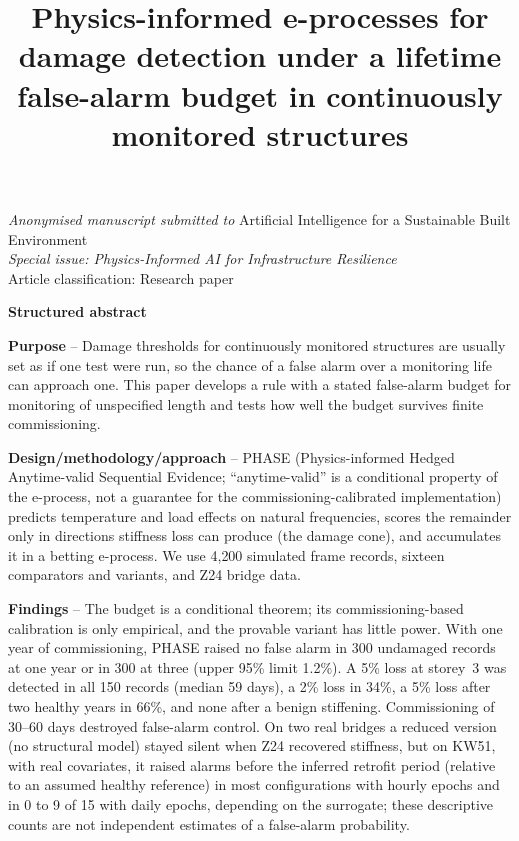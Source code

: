 \documentclass[12pt,a4paper]{article}
\title{\textbf{Physics-informed e-processes for damage detection under a lifetime false-alarm budget in continuously monitored structures}}
\date{}
\newcommand{\rev}[1]{#1}
\newcommand{\rev}[1]{{\color{revcol}#1}}
\begin{document}
\maketitle
\thispagestyle{empty}

\begin{center}
\textit{Anonymised manuscript submitted to} Artificial Intelligence for a Sustainable Built Environment\\
\textit{Special issue: Physics-Informed AI for Infrastructure Resilience}\\
Article classification: Research paper
\end{center}

\vspace{1em}

\begin{singlespace}
\noindent\textbf{Structured abstract}

\rev{\noindent\textbf{Purpose} -- Damage thresholds for continuously monitored structures are usually set as if one test were run, so the chance of a false alarm over a monitoring life can approach one. This paper develops a rule with a stated false-alarm budget for monitoring of unspecified length and tests how well the budget survives finite commissioning.}

\color{revcolb}\rev{\noindent\textbf{Design/methodology/approach} -- PHASE (Physics-informed Hedged Anytime-valid Sequential Evidence; ``anytime-valid'' is a conditional property of the e-process, not a guarantee for the commissioning-calibrated implementation) predicts temperature and load effects on natural frequencies, scores the remainder only in directions stiffness loss can produce (the damage cone), and accumulates it in a betting e-process.\color{revcol} We use 4{,}200 simulated frame records, sixteen comparators and variants, and Z24 bridge data.}

\rev{\noindent\textbf{Findings} -- The budget is a conditional theorem; its commissioning-based calibration is only empirical, and the provable variant has little power. With one year of commissioning, PHASE raised no false alarm in 300 undamaged records at one year or in 300 at three (upper 95\% limit 1.2\%). A 5\% loss at storey~3 was detected in all 150 records (median 59 days), a 2\% loss in 34\%, a 5\% loss after two healthy years in 66\%, and none after a benign stiffening. Commissioning of 30--60 days destroyed false-alarm control. \color{revcolb}On two real bridges a reduced version (no structural model) stayed silent when Z24 recovered stiffness, but on KW51, with real covariates, it raised alarms before the inferred retrofit period (relative to an assumed healthy reference) in most configurations with hourly epochs and in 0 to 9 of 15 with daily epochs, depending on the surrogate; these descriptive counts are not independent estimates of a false-alarm probability.}\color{black}


\end{singlespace}
\end{document}
